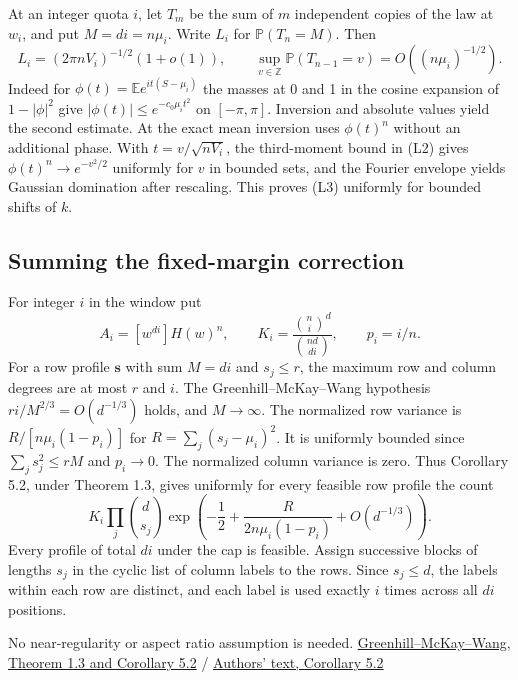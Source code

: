 At an integer quota $i$, let $T_m$ be the sum of $m$ independent
copies of the law at $w_i$, and put $M=di=n\mu_i$. Write $L_i$ for
$\mathbb P(T_n=M)$. Then
\begin{equation}
L_i=(2\pi nV_i)^{-1/2}(1+o(1)),\qquad
\sup_{v\in\mathbb Z}\mathbb P(T_{n-1}=v)=O((n\mu_i)^{-1/2}).
\tag{L3}
\end{equation}
Indeed for $\phi(t)=\mathbb E e^{it(S-\mu_i)}$ the masses at 0
and 1 in the cosine expansion of $1-|\phi|^2$ give
$|\phi(t)|\le e^{-c_0\mu_i t^2}$ on $[-\pi,\pi]$. Inversion and
absolute values yield the second estimate. At the exact mean
inversion uses $\phi(t)^n$ without an additional phase. With
$t=v/\sqrt{nV_i}$, the third-moment bound in (L2) gives
$\phi(t)^n\to e^{-v^2/2}$ uniformly for $v$ in bounded sets,
and the Fourier envelope yields Gaussian domination after
rescaling. This proves (L3) uniformly for bounded shifts of $k$.

\subsection{Summing the fixed-margin correction}

For integer $i$ in the window put
\begin{equation*}
A_i=[w^{di}]H(w)^n,\qquad K_i=\frac{\binom ni^d}{\binom{nd}{di}},
\qquad p_i=i/n.
\end{equation*}
For a row profile $\mathbf s$ with sum $M=di$ and $s_j\le r$,
the maximum row and column degrees are at most $r$ and $i$.
The Greenhill--McKay--Wang hypothesis
$ri/M^{2/3}=O(d^{-1/3})$ holds, and $M\to\infty$.
The normalized row variance is
$R/[n\mu_i(1-p_i)]$ for $R=\sum_j(s_j-\mu_i)^2$.
It is uniformly bounded since $\sum_j s_j^2\le rM$ and $p_i\to0$.
The normalized column variance is zero. Thus Corollary 5.2,
under Theorem 1.3, gives uniformly for every feasible row
profile the count
\begin{equation}
K_i\prod_j\binom d{s_j}
\exp\left(-\frac12+\frac{R}{2n\mu_i(1-p_i)}
                       +O(d^{-1/3})\right).
\tag{L4}
\end{equation}
Every profile of total $di$ under the cap is feasible. Assign successive blocks of lengths $s_j$ in the cyclic list of column labels to the rows. Since $s_j\le d$, the labels within each row are distinct, and each label is used exactly $i$ times across all $di$ positions.

No near-regularity or aspect ratio assumption is needed. \href{https://doi.org/10.1016/j.jcta.2005.03.005}{Greenhill--McKay--Wang, Theorem 1.3 and Corollary 5.2} / \href{https://web.maths.unsw.edu.au/~csg/papers/irregular-final.pdf#page=33}{Authors' text, Corollary 5.2}

